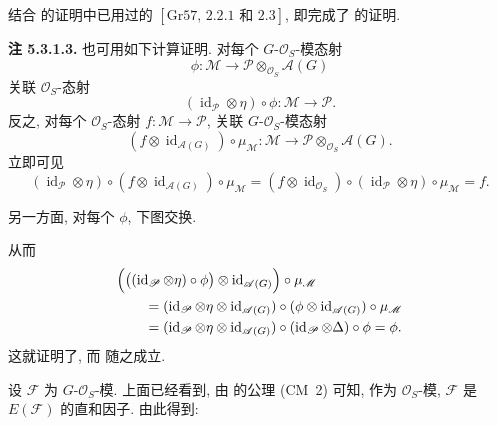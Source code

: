 结合 的证明中已用过的
\([\mathrm{Gr}57,\,2.2.1\text{ 和 }2.3]\), 即完成了 的证明.

\medskip
\noindent{}\textbf{注 5.3.1.3.}
 也可用如下计算证明.
对每个 \(G\)-\(\mathscr O_S\)-模态射
\[
  \phi:\mathscr M\longrightarrow
    \mathscr P\otimes_{\mathscr O_S}\mathscr A(G)
\]
关联 \(\mathscr O_S\)-态射
\[
  (\operatorname{id}_{\mathscr P}\otimes\eta)\circ\phi:
    \mathscr M\longrightarrow\mathscr P.
\]
反之, 对每个 \(\mathscr O_S\)-态射
\(f:\mathscr M\to\mathscr P\), 关联 \(G\)-\(\mathscr O_S\)-模态射
\[
  (f\otimes\operatorname{id}_{\mathscr A(G)})\circ\mu_{\mathscr M}:
    \mathscr M\longrightarrow
    \mathscr P\otimes_{\mathscr O_S}\mathscr A(G).
\]
立即可见
\[
  (\operatorname{id}_{\mathscr P}\otimes\eta)
    \circ(f\otimes\operatorname{id}_{\mathscr A(G)})
    \circ\mu_{\mathscr M}
  =(f\otimes\operatorname{id}_{\mathscr O_S})
    \circ(\operatorname{id}_{\mathscr P}\otimes\eta)
    \circ\mu_{\mathscr M}
  =f.
\]

另一方面, 对每个 \(\phi\), 下图交换.

\begin{figure}[H]
  \centering
  
  \label{fig:sga3-exp1-p038-induction-adjunction-square}
\end{figure}

从而
\begin{align*}
 &\Bigl(
    \bigl((\operatorname{id}_{\mathscr P}\otimes\eta)\circ\phi\bigr)
      \otimes\operatorname{id}_{\mathscr A(G)}
  \Bigr)\circ\mu_{\mathscr M}\\
 &\qquad=
  (\operatorname{id}_{\mathscr P}\otimes\eta
     \otimes\operatorname{id}_{\mathscr A(G)})
  \circ(\phi\otimes\operatorname{id}_{\mathscr A(G)})
  \circ\mu_{\mathscr M}\\
 &\qquad=
  (\operatorname{id}_{\mathscr P}\otimes\eta
     \otimes\operatorname{id}_{\mathscr A(G)})
  \circ(\operatorname{id}_{\mathscr P}\otimes\Delta)
  \circ\phi
  =\phi.
\end{align*}
这就证明了,
而 随之成立.

设 \(\mathscr F\) 为 \(G\)-\(\mathscr O_S\)-模. 上面已经看到,
由 的公理 (CM~2) 可知,
作为 \(\mathscr O_S\)-模, \(\mathscr F\) 是 \(E(\mathscr F)\) 的直和因子.
由此得到:

